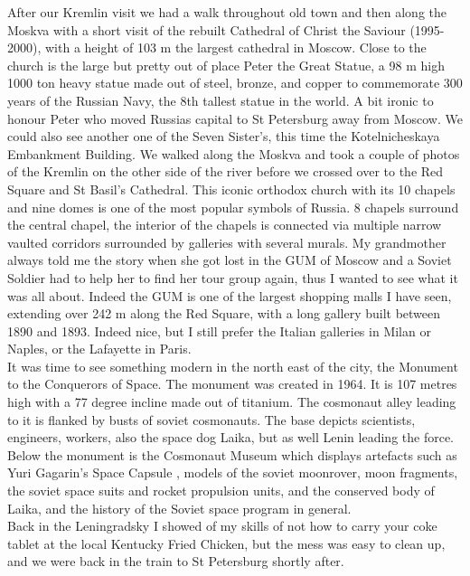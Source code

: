 After our Kremlin visit we had a walk throughout old town and then along the Moskva with a short visit of the rebuilt Cathedral of Christ the Saviour (1995-2000), with a height of 103 m the largest cathedral in Moscow. Close to the church is the large but pretty out of place Peter the Great Statue, a 98 m high 1000 ton heavy statue made out of steel, bronze, and copper to commemorate 300 years of the Russian Navy, the 8th tallest statue in the world. A bit ironic to honour Peter who moved Russias capital to St Petersburg away from Moscow. We could also see another one of the Seven Sister's, this time the Kotelnicheskaya Embankment Building. We walked along the Moskva and took a couple of photos of the Kremlin on the other side of the river before we crossed over to the Red Square and St Basil's Cathedral. This iconic orthodox church with its 10 chapels and nine domes is one of the most popular symbols of Russia. 8 chapels surround the central chapel, the interior of the chapels is connected via multiple narrow vaulted corridors surrounded by galleries with several murals. My grandmother always told me the story when she got lost in the GUM of Moscow and a Soviet Soldier had to help her to find her tour group again, thus I wanted to see what it was all about. Indeed the GUM is one of the largest shopping malls I have seen, extending over 242 m along the Red Square, with a long gallery built between 1890 and 1893. Indeed nice, but I still prefer the Italian galleries in Milan or Naples, or the Lafayette in Paris.\\
It was time to see something modern in the north east of the city, the Monument to the Conquerors of Space. The monument was created in 1964. It is 107 metres high with a 77 degree incline made out of titanium. The cosmonaut alley leading to it is flanked by busts of soviet cosmonauts. The base depicts scientists, engineers, workers, also the space dog Laika, but as well Lenin leading the force. Below the monument is the Cosmonaut Museum which displays artefacts such as Yuri Gagarin's Space Capsule , models of the soviet moonrover, moon fragments, the soviet space suits and rocket propulsion units, and the conserved body of Laika, and the history of the Soviet space program in general.\\
Back in the Leningradsky I showed of my skills of not how to carry your coke tablet at the local Kentucky Fried Chicken, but the mess was easy to clean up, and we were back in the train to St Petersburg shortly after.\\

